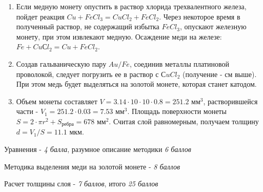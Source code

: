 \solutionSection

\begin{enumerate}
    \item Если медную монету опустить в раствор хлорида трехвалентного железа, пойдет реакция $Cu + FeCl_3 = CuCl_2 + FeCl_2$. 
    Через некоторое время в полученный раствор, не содержащий избытка $FeCl_3$, опускают железную монету, при 
    этом извлекают медную. Осаждение меди на железе: \linebreak $Fe + CuСl_2 = Cu + FeCl_2$.
    \item Создав гальваническую пару $Au/Fe$, соединив металлы платиновой проволокой, следует погрузить ее в 
    раствор с $СuCl_2$ (получение - см выше). При этом медь будет выделяться на золотой монете, которая станет катодом.
    \item Объем монеты составляет $V = 3.14 \cdot 10 \cdot 10 \cdot 0.8 = 251.2$ мм$^3$, растворившейся части - 
    $V_1 = 251.2 \cdot 0.03 = 7.53$ мм$^3$. Площадь поверхности монеты \linebreak $S = 2 \cdot \pi r^2 + S_{\text{ребра}}= 678$ мм$^2$. 
    Считая слой равномерным, получаем толщину $d = V_1/S = 11.1$ мкм.
\end{enumerate}

\additionalCriteria

Уравнения - \textit{4 балла}, разумное описание методики \textit{6 баллов}

Методика выделения меди на золотой монете - \textit{8 баллов}

Расчет толщины слоя - \textit{7 баллов}, итого \textit{25 баллов}